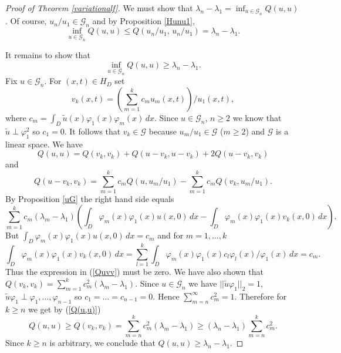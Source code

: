 \documentclass[11pt,leqno]{article}
\theoremstyle{definition}
\numberwithin{equation}{section}
\begin{document}
\begin{proof}[Proof of Theorem \ref{variationalf}]
We must show that $\lambda_n - \lambda_1 = \inf_{u \in \mathcal{G}_n} Q(u,u)$. 
Of course, $u_n/u_1 \in \mathcal{G}_n$ and by Proposition \ref{Hunu1},
$$
\inf_{u \in \mathcal{G}_n} Q(u,u) \le Q(u_n/u_1, \, u_n/u_1) = \lambda_n - \lambda_1.
$$

It remains to show that $$\inf_{u \in \mathcal{G}_n} Q(u,u) \ge \lambda_n - \lambda_1.$$
Fix $u \in \mathcal{G}_n$. For  $(x,t) \in H_D$ set
$$
v_{k}(x,t) = (\sum_{m = 1}^{k} c_m u_m(x,t))/u_1(x,t),
$$
where $c_m = \int_{D} \tilde{u}(x) \varphi_1(x) \varphi_m(x) \, dx$.
Since $u \in \mathcal{G}_n$, $n \ge 2$ we know that $\tilde{u} \perp \varphi_1^2$ so $c_1 = 0$. It follows that $v_k \in \mathcal{G}$ because $u_m/u_1 \in \mathcal{G}$ ($m \ge 2$) and $\mathcal{G}$ is a linear space. We have
\begin{equation}
\label{Q(u,u)}
Q(u,u) = Q(v_k,v_k) + Q(u - v_k, u- v_k) + 2 Q(u - v_k, v_k)
\end{equation}
and
\begin{equation}
\label{Quvv}
Q(u - v_k, v_k) = \sum_{m = 1}^{k} c_m Q(u,u_m/u_1) - 
\sum_{m = 1}^{k} c_m Q(v_k,u_m/u_1).
\end{equation}
By Proposition \ref{uG} the right hand side equals 
$$
\sum_{m = 1}^{k} c_m (\lambda_m - \lambda_1) 
\left( \int_{D} \varphi_m(x) \varphi_1(x) u(x,0) \, dx  
- \int_{D} \varphi_m(x) \varphi_1(x) v_k(x,0) \, dx \right).
$$
But $\int_{D} \varphi_m(x) \varphi_1(x) u(x,0) \, dx = c_m$ and for $m = 1, \ldots , k$
$$
\int_{D} \varphi_m(x) \varphi_1(x) v_k(x,0) \, dx = 
\sum_{l = 1}^{k} \int_{D} \varphi_m(x) \varphi_1(x) c_l \varphi_l(x)/\varphi_1(x) \, dx
= c_m.
$$ 
Thus  the expression in (\ref{Quvv}) must be zero. We have also shown that $Q(v_k,v_k) =
\sum_{m = 1}^{k} c_m^2 (\lambda_m - \lambda_1)$. Since $u \in \mathcal{G}_n$ we have
$||\tilde{u} \varphi_1||_2 = 1$, $\tilde{u} \varphi_1 \perp \varphi_1, \ldots, \varphi_{n - 1}$ so
$c_1 = \ldots = c_{n - 1} = 0$. Hence $\sum_{m = n}^{\infty} c_m^2 = 1$. Therefore for $k \ge
n$ we get by (\ref{Q(u,u)})
$$
Q(u,u) \ge Q(v_k,v_k) = \sum_{m = n}^{k} c_m^2 (\lambda_m - \lambda_1)
\ge (\lambda_n - \lambda_1) \sum_{m = n}^{k} c_m^2.
$$
Since $k \ge n$ is arbitrary, we conclude that $Q(u,u) \ge \lambda_n - \lambda_1$.
\end{proof}
\end{document}
